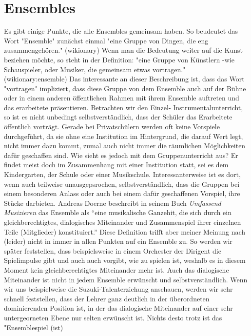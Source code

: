 \section{Ensembles}

Es gibt einige Punkte, die alle Ensembles gemeinsam haben. So beudeutet das Wort
"Ensemble" zunächst einmal "eine Gruppe von Dingen, die eng zusammengehören."
(wikionary) Wenn man die Bedeutung weiter auf die Kunst beziehen möchte, so
steht in der Definition: "eine Gruppe von Künstlern -wie Schauspieler, oder
Musiker, die gemeinsam etwas vortragen." (wikionary:ensemble) Das interessante
an dieser Beschreibung ist, dass das Wort "vortragen" impliziert, dass diese
Gruppe von dem Ensemble auch auf der Bühne oder in einem anderen öffentlichen
Rahmen mit ihrem Ensemble auftreten und das erarbeitete präsentieren. Betrachten
wir den Einzel- Instrumentalunterricht, so ist es nicht unbedingt
selbstverständlich, dass der Schüler das Erarbeitete öffentlich vorträgt. Gerade
bei Privatschülern werden oft keine Vorspiele durchgeführt, da sie ohne eine
Institution im Hintergrund, die darauf Wert legt, nicht immer dazu kommt, zumal
auch nicht immer die räumlichen Möglichkeiten dafür geschaffen sind. Wie sieht
es jedoch mit dem Gruppenunterricht aus? Er findet meist doch im Zusammenhang
mit einer Institution statt, sei es dem Kindergarten, der Schule oder einer
Musikschule. Interessanterweise ist es dort, wenn auch teilweise
unausgepsrochen, selbstverständlich, dass die Gruppen bei einem besonderen
Anlass oder auch bei einem dafür geschaffenen Vorspiel, ihre Stücke darbieten.
Andreas Doerne beschreibt in seinem Buch \emph{Umfassend Musizieren} das
Ensemble als \enquote{eine musikalische Ganzehit, die sich durch ein
gleichberechtigtes, dialogisches Miteinander und Zusammenspiel ihrer einzelnen
Teile (Mitglieder) konstituiert.} \autocite[62]{doerne:umfassend_musizieren}
Diese Definition trifft aber meiner Meinung nach (leider) nicht in immer in
allen Punkten auf ein Ensemble zu. So werden wir später feststellen, dass
beispielsweise in einem Orchester der Dirigent die Spielimpulse gibt und auch
auch vorgibt, wie zu spielen ist, weshalb es in diesem Moment kein
gleichberechtigtes Miteinander mehr ist. Auch das dialogische Miteinander ist
nicht in jedem Ensemble erwünscht und selbstverständlich. Wenn wir uns
beispielweise die Suzuki-Talenterziehung anschauen, werden wir sehr schnell
feststellen, dass der Lehrer ganz deutlich in der überordneten dominierenden
Position ist, in der das dialogische Miteinander auf einer sehr untergeorneten
Ebene nur selten erwünscht ist. Nichts desto trotz ist das "Ensemblespiel (ist)
